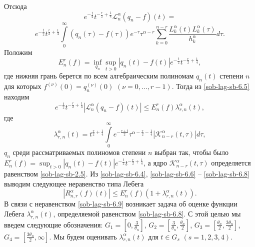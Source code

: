 Отсюда
$$
e^{-\frac t2}t^{-\frac r2+\frac14}\mathcal{L}_n^\alpha(q_n-f)(t)=
$$
\begin{equation}\label{sob-lag-sb-6.5}
  e^{-\frac t2}t^{\frac r2+\frac14}\int\limits_0^\infty(q_n(\tau)-f(\tau))e^{-\tau}\tau^{\alpha-r}\sum\limits_{k=0}^{n-r}\frac{L_k^\alpha(t)L_k^\alpha(\tau)}{h_k^\alpha}d\tau.
\end{equation}
Положим
\begin{equation}\label{sob-lag-sb-6.6}
  E_n^r(f)=\inf\limits_{q_n}\sup\limits_{t>0}|q_n(t)-f(t)|e^{-\frac t2}t^{-\frac r2+\frac14},
\end{equation}
где нижняя грань берется по всем алгебраическим полиномам $q_n(t)$ степени $n$ для которых $f^{(\nu)}(0)=q_n^{(\nu)}(0)$ $(\nu=0,\ldots,r-1)$. Тогда из \eqref{sob-lag-sb-6.5} находим
\begin{equation}\label{sob-lag-sb-6.7}
 e^{-\frac{t}{2}} t^{-\frac r2+\frac14}|\mathcal{L}_n^\alpha(q_n-f)(t)|\le E_n^r(f)\lambda_{r,n}^\alpha(t),
\end{equation}
где
\begin{equation}\label{sob-lag-sb-6.8}
  \lambda_{r,n}^\alpha(t)=t^{\frac r2+\frac14}\int\limits_0^\infty e^{-\frac{\tau+t}2}\tau^{\alpha-\frac r2-\frac14}|\mathcal{K}_{n-r}^\alpha(t,\tau)|d\tau,
\end{equation}
 $q_n$  среди рассматриваемых полиномов степени $n$ выбран так, чтобы было
$E_n^r(f)=\sup_{t>0}|q_n(t)-f(t)|e^{-\frac t2}t^{-\frac r2+\frac14}$,
а ядро $\mathcal{K}_{n-r}^\alpha(t,\tau)$ определяется равенством \eqref{sob-lag-sb-2.5}.
Из \eqref{sob-lag-sb-6.4}, \eqref{sob-lag-sb-6.6} -- \eqref{sob-lag-sb-6.8} выводим следующее неравенство типа Лебега
\begin{equation}\label{sob-lag-sb-6.9}
  |R_{n,r}^\alpha(f)(t)|\le E_n^r(f)(1+\lambda_{r,n}^\alpha(t)).
\end{equation}
В связи с неравенством \eqref{sob-lag-sb-6.9} возникает задача об оценке функции Лебега $\lambda_{r,n}^\alpha(t)$, определяемой равенством \eqref{sob-lag-sb-6.8}. С этой целью мы введем следующие обозначения: $G_1=[0,\frac3{\theta_n}]$, $G_2=[\frac3{\theta_n},\frac{\theta_n}2]$, $G_3=[\frac{\theta_n}2,\frac{3\theta_n}2]$, $G_4=[\frac{3\theta_n}2,\infty]$. Мы будем оценивать $\lambda_{r,n}^\alpha(t)$ для $t\in G_s$ $(s=1,2,3,4)$.
